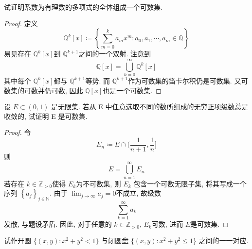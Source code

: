 \documentclass[../main.tex]{subfiles}
\begin{document}
\begin{exercise}{}{}
    试证明系数为有理数的多项式的全体组成一个可数集.
\end{exercise}
\begin{proof}
   定义 \[
   \mathbb{Q} ^{k}[x]\coloneqq\left\{  \sum _{m= 0}^{k}a_{m}x^{m}: a_0,a_1,\cdots ,a_{m}\in \mathbb{Q}  \right\}
   \]易见存在 \(  \mathbb{Q} ^{k}\left[ x \right]   \)到 \(  \mathbb{Q} ^{k+ 1}  \)之间的一个双射. 注意到 \[
   \mathbb{Q} [x]= \bigcup _{k= 0}^{\infty}\mathbb{Q} ^{k}[x]
   \]  其中每个 \(  \mathbb{Q} ^{k}\left[ x \right]   \)都与 \(  \mathbb{Q} ^{k+ 1}  \)等势. 而 \(  \mathbb{Q} ^{k+ 1}  \)作为可数集的笛卡尔积仍是可数集. 又可数集的可数并仍可数, 因此 \(  \mathbb{Q} \left[ x \right]   \)也是一个可数集.   
\end{proof}
\begin{exercise}{}{}
设 $E \subset (0,1)$ 是无限集. 若从 E 中任意选取不同的数所组成的无穷正项级数总是收敛的, 试证明 E 是可数集.
\end{exercise}
\begin{proof}
令 \[
E_{n}\coloneqq E\cap (\frac{1 }{n+ 1 },\frac{1 }{n }  ]
\]则 \[
E= \bigcup _{n = 1}^{\infty}E_{n}
\] 若存在 \(  k \in \mathbb{Z} _{> 0}  \)使得 \(  E_{k}  \)为不可数集, 则 \(  E_{k}  \) 包含一个可数无限子集, 将其写成一个序列 \(  \left\{ a_{j} \right\}_{j \in \mathbb{N} }  \).   由于 \(  \lim_{j\to \infty}a_{j}= 0  \)不成立, 故级数\[
\sum _{k= 1}^{\infty}a_{k}
\] 发散, 与题设矛盾.  因此, 对于任意的 \(  k \in \mathbb{Z} _{> 0}  \), \(  E_{k}  \)可数, 进而 \(  E  \)是可数集.   
\end{proof}
\begin{exercise}{}{}
试作开圆 $\{(x,y): x^2+y^2<1\}$ 与闭圆盘 $\{(x,y): x^2+y^2 \le 1\}$ 之间的一一对应.
\end{exercise}
\end{document}
